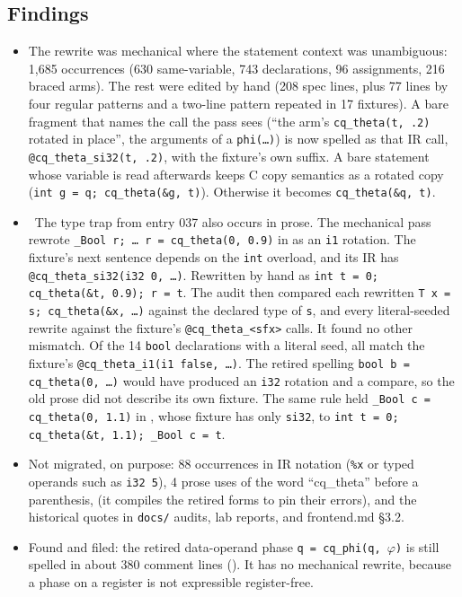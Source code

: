 \subsection*{Findings}
\begin{itemize}
  \item The rewrite was mechanical where the statement context was unambiguous: 1,685
  occurrences (630 same-variable, 743 declarations, 96 assignments, 216 braced arms).
  The rest were edited by hand (208 spec lines, plus 77 lines by four regular patterns
  and a two-line pattern repeated in 17 fixtures). A bare fragment that names the call
  the pass sees (``the arm's \texttt{cq\_theta(t, .2)} rotated in place'', the arguments of
  a \texttt{phi(\ldots)}) is now spelled as that IR call, \texttt{@cq\_theta\_si32(t, .2)},
  with the fixture's own suffix. A bare statement whose variable is read afterwards keeps
  C copy semantics as a rotated copy (\texttt{int g = q; cq\_theta(\&g, t)}). Otherwise it
  becomes \texttt{cq\_theta(\&q, t)}.
  \item \fconfirmed\ The type trap from entry 037 also occurs in prose. The mechanical pass
  rewrote \texttt{\_Bool r; \ldots\ r = cq\_theta(0, 0.9)} in
   as an \texttt{i1}
  rotation. The fixture's next sentence depends on the \texttt{int} overload, and its IR has
  \texttt{@cq\_theta\_si32(i32 0, \ldots)}. Rewritten by hand as \texttt{int t = 0;
  cq\_theta(\&t, 0.9); r = t}. The audit then compared each rewritten
  \texttt{T x = s; cq\_theta(\&x, \ldots)} against the declared type of \texttt{s}, and
  every literal-seeded rewrite against the fixture's \texttt{@cq\_theta\_<sfx>} calls. It
  found no other mismatch. Of the 14 \texttt{bool} declarations with a literal seed, all
  match the fixture's \texttt{@cq\_theta\_i1(i1 false, \ldots)}. The retired spelling
  \texttt{bool b = cq\_theta(0, \ldots)} would have produced an \texttt{i32} rotation and a
  compare, so the old prose did not describe its own fixture.
  The same rule held \texttt{\_Bool c = cq\_theta(0, 1.1)} in
  , whose fixture has only
  \texttt{si32}, to \texttt{int t = 0; cq\_theta(\&t, 1.1); \_Bool c = t}.
  \item Not migrated, on purpose: 88 occurrences in IR notation (\texttt{\%x} or typed
  operands such as \texttt{i32 5}), 4 prose uses of the word ``cq\_theta'' before a
  parenthesis,  (it compiles the retired forms
  to pin their errors), and the historical quotes in \texttt{docs/} audits, lab reports,
   and frontend.md \S3.2.
  \item Found and filed: the retired data-operand phase \texttt{q = cq\_phi(q, $\varphi$)}
  is still spelled in about 380 comment lines (). It has no
  mechanical rewrite, because a phase on a register is not expressible register-free.
\end{itemize}


